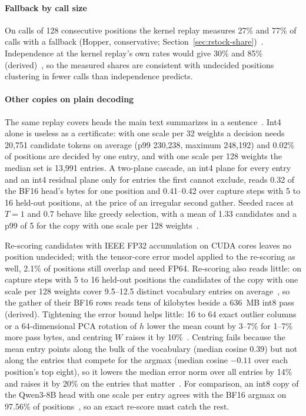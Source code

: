 \paragraph{Fallback by call size} On calls of 128 consecutive positions the kernel replay measures 27\% and 77\% of calls with a fallback (Hopper, conservative; Section~\ref{sec:rstock-share})~. Independence at the kernel replay's own rates would give 30\% and 85\% (derived)~, so the measured shares are consistent with undecided positions clustering in fewer calls than independence predicts.

\paragraph{Other copies on plain decoding} The same replay covers heads the main text summarizes in a sentence~. Int4 alone is useless as a certificate: with one scale per 32 weights a decision needs 20,751 candidate tokens on average (p99 230,238, maximum 248,192) and 0.02\% of positions are decided by one entry, and with one scale per 128 weights the median set is 13,991 entries. A two-plane cascade, an int4 plane for every entry and an int4 residual plane only for entries the first cannot exclude, reads 0.32 of the BF16 head's bytes for one position and 0.41--0.42 over capture steps with 5 to 16 held-out positions, at the price of an irregular second gather. Seeded races at $T=1$ and 0.7 behave like greedy selection, with a mean of 1.33 candidates and a p99 of 5 for the copy with one scale per 128 weights~.

Re-scoring candidates with IEEE FP32 accumulation on CUDA cores leaves no position undecided; with the tensor-core error model applied to the re-scoring as well, 2.1\% of positions still overlap and need FP64. Re-scoring also reads little: on capture steps with 5 to 16 held-out positions the candidates of the copy with one scale per 128 weights cover 9.5--12.5 distinct vocabulary entries on average~, so the gather of their BF16 rows reads tens of kilobytes beside a 636~MB int8 pass (derived). Tightening the error bound helps little: 16 to 64 exact outlier columns or a 64-dimensional PCA rotation of $h$ lower the mean count by 3--7\% for 1--7\% more pass bytes, and centring $W$ raises it by 10\%~. Centring fails because the mean entry points along the bulk of the vocabulary (median cosine 0.39) but not along the entries that compete for the argmax (median cosine $-0.11$ over each position's top eight), so it lowers the median error norm over all entries by 14\% and raises it by 20\% on the entries that matter~. For comparison, an int8 copy of the Qwen3-8B head with one scale per entry agrees with the BF16 argmax on 97.56\% of positions~\cite{archead}, so an exact re-score must catch the rest.

